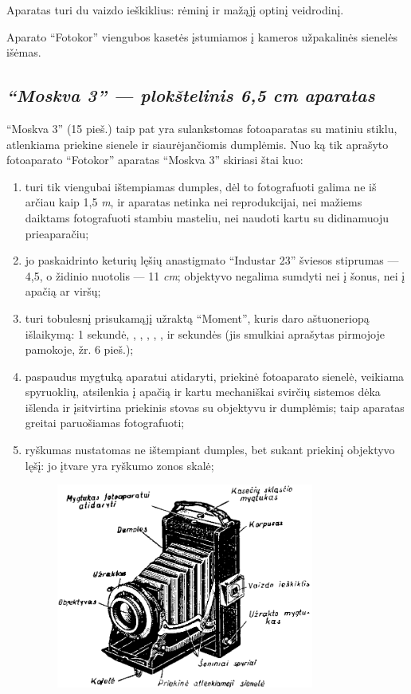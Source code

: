 \documentclass[12pt]{book}
\begin{document}
			Aparatas turi du vaizdo ieškiklius: rėminį ir mažąjį optinį veidrodinį.

			Aparato ``Fotokor'' viengubos kasetės įstumiamos į kameros užpakalinės sienelės išėmas.
		\subsection*{\textit{``Moskva 3'' --- plokštelinis 6,5  cm aparatas}}
			``Moskva 3'' (15 pieš.) taip pat yra sulankstomas fotoaparatas su matiniu stiklu, atlenkiama priekine sienele ir siaurėjančiomis dumplėmis. Nuo ką tik aprašyto fotoaparato ``Fotokor'' aparatas ``Moskva 3'' skiriasi štai kuo:
			\begin{enumerate}[1)]
				\item turi tik viengubai ištempiamas dumples, dėl to fotografuoti galima ne iš arčiau kaip 1,5 \textit{m}, ir aparatas netinka nei reprodukcijai, nei mažiems daiktams fotografuoti stambiu masteliu, nei naudoti kartu su didinamuoju prieaparačiu;
				\item jo paskaidrinto keturių lęšių anastigmato ``Industar 23'' šviesos stiprumas --- 4,5, o židinio nuotolis --- 11 \textit{cm}; objektyvo negalima sumdyti nei į šonus, nei į apačią ar viršų;
				\item turi tobulesnį prisukamąjį užraktą ``Moment'', kuris daro aštuoneriopą išlaikymą: 1 sekundė, , , , , ,  ir  sekundės (jis smulkiai aprašytas pirmojoje pamokoje, žr. 6 pieš.);
				\item paspaudus mygtuką aparatui atidaryti, priekinė fotoaparato sienelė, veikiama spyruoklių, atsilenkia į apačią ir kartu mechaniškai svirčių sistemos dėka išlenda ir įsitvirtina priekinis stovas su objektyvu ir dumplėmis; taip aparatas greitai paruošiamas fotografuoti;
				\item ryškumas nustatomas ne ištempiant dumples, bet sukant priekinį objektyvo lęšį: jo įtvare yra ryškumo zonos skalė;
				\begin{figure}[h]
					\centering
					\includegraphics[width=0.8\textwidth]{15-pav}

\end{figure}
\end{enumerate}
\end{document}
